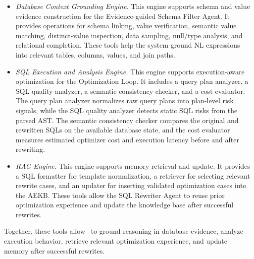 \begin{itemize}[leftmargin=10pt]
	\item \textit{Database Context Grounding Engine.}
	This engine supports schema and value evidence construction for the Evidence-guided Schema Filter Agent.
	It provides operations for schema linking, value verification, semantic value matching, distinct-value inspection, data sampling, null/type analysis, and relational completion.
	These tools help the system ground NL expressions into relevant tables, columns, values, and join paths.
	
	\item \textit{SQL Execution and Analysis Engine.}
	This engine supports execution-aware optimization for the Optimization Loop.
	It includes a query plan analyzer, a SQL quality analyzer, a semantic consistency checker, and a cost evaluator.
	The query plan analyzer normalizes raw query plans into plan-level risk signals, while the SQL quality analyzer detects static SQL risks from the parsed AST.
	The semantic consistency checker compares the original and rewritten SQLs on the available database state, and the cost evaluator measures estimated optimizer cost and execution latency before and after rewriting.
	
	\item \textit{RAG Engine.}
	This engine supports memory retrieval and update.
	It provides a SQL formatter for template normalization, a retriever for selecting relevant rewrite cases, and an updater for inserting validated optimization cases into the AEKB.
	These tools allow the SQL Rewriter Agent to reuse prior optimization experience and update the knowledge base after successful rewrites.
\end{itemize}

Together, these tools allow \toolname\ to ground reasoning in database evidence, analyze execution behavior, retrieve relevant optimization experience, and update memory after successful rewrites.



\endgroup